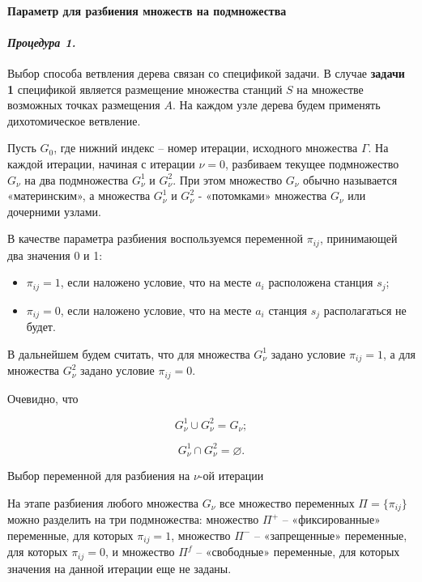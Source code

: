 \paragraph{Параметр для разбиения множеств на подмножества}


\paragraph{\textit{\textbf{Процедура 1.}}}

Выбор способа ветвления дерева связан со спецификой задачи. В случае \textbf{задачи 1} спецификой является размещение множества станций $S$ на множестве возможных точках размещения $A$. На каждом узле дерева будем применять дихотомическое ветвление.

Пусть $G_0$, где нижний индекс – номер итерации, исходного множества $\Gamma$. На каждой итерации, начиная с итерации $\nu=0$, разбиваем текущее подмножество $G_\nu$ на два подмножества $G^1_\nu$ и $G^2_\nu$. При этом множество $G_\nu$ обычно называется «материнским», а множества $G^1_\nu$  и $G^2_\nu$  - «потомками» множества $G_\nu$ или дочерними узлами.

В качестве параметра разбиения воспользуемся переменной $\pi_{ij}$, принимающей два значения 0 и 1:

\begin{itemize}
    \item $\pi_{ij}=1$, если наложено условие, что на месте $a_i$ расположена станция $s_j$;
    \item $\pi_{ij} = 0$, если наложено условие, что на месте $a_i$ станция $s_j$  располагаться не будет.
\end{itemize}

В дальнейшем будем считать, что для множества $G^1_\nu$ задано условие $\pi_{ij}=1$, а для множества $G^2_\nu$  задано условие $\pi_{ij} = 0$.

Очевидно, что

\begin{equation}
    \label{eq:part4_G_cup}
    G^1_\nu \cup G^2_\nu = G_\nu;
\end{equation}


\begin{equation}
    \label{eq:part4_G_cap}
    G^1_\nu \cap G^2_\nu = \varnothing.
\end{equation}

Выбор переменной для разбиения на $\nu$-ой итерации

На этапе разбиения любого множества $G_\nu$ все множество переменных $\Pi = \{\pi_{ij}\}$ можно разделить на три подмножества: множество $\Pi^+$ -- «фиксированные» переменные, для которых $\pi_{ij}=1$, множество $\Pi^-$ -- «запрещенные» переменные, для которых $\pi_{ij}=0$, и множество $\Pi^f$ -- «свободные» переменные, для которых значения на данной итерации еще не заданы.

